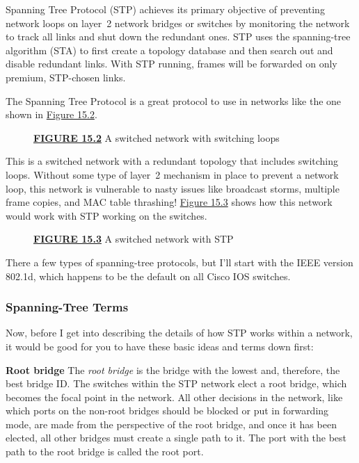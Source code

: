 Spanning Tree Protocol (STP) achieves its primary objective of
preventing network loops on layer~2 network bridges or switches by
monitoring the network to track all links and shut down the redundant
ones. STP uses the spanning-tree algorithm (STA) to first create a
topology database and then search out and disable redundant links. With
STP running, frames will be forwarded on only premium, STP-chosen links.

The Spanning Tree Protocol is a great protocol to use in networks like
the one shown in \protect\hyperlink{c15.xhtmlux5cux23figure15-2}{Figure
15.2}.



\begin{figure}
\centering
\caption{{\protect\hyperlink{c15.xhtmlux5cux23figureanchor15-2}{\textbf{FIGURE
15.2}} A switched network with switching loops}}
\end{figure}

This is a switched network with a redundant topology that includes
switching loops. Without some type of layer~2 mechanism in place to
prevent a network loop, this network is vulnerable to nasty issues like
broadcast storms, multiple frame copies, and MAC table thrashing!
\protect\hyperlink{c15.xhtmlux5cux23figure15-3}{Figure 15.3} shows how
this network would work with STP working on the switches.

\begin{figure}
\centering
\caption{{\protect\hyperlink{c15.xhtmlux5cux23figureanchor15-3}{\textbf{FIGURE
15.3}} A switched network with STP}}
\end{figure}

There a few types of spanning-tree protocols, but I'll start with the IEEE version 802.1d, which happens to be the default on all Cisco IOS switches.

\subsubsection[Spanning-Tree
Terms]{\texorpdfstring{\protect\hypertarget{c15.xhtmlux5cux23c15-sec-10}{}{}Spanning-Tree
Terms}{Spanning-Tree Terms}}

Now, before I get into describing the details of how STP works within a
network, it would be good for you to have these basic ideas and terms
down first:

\textbf{Root bridge} The \emph{root bridge} is the bridge with the
lowest and, therefore, the best bridge ID. The switches within the STP
network elect a root bridge, which becomes the focal
point in the network.
All other decisions in the network, like which ports on the non-root
bridges should be blocked or put in forwarding mode, are made from the
perspective of the root bridge, and once it has been elected, all other
bridges must create a single path to it. The port with the best path to
the root bridge is called the root port.


